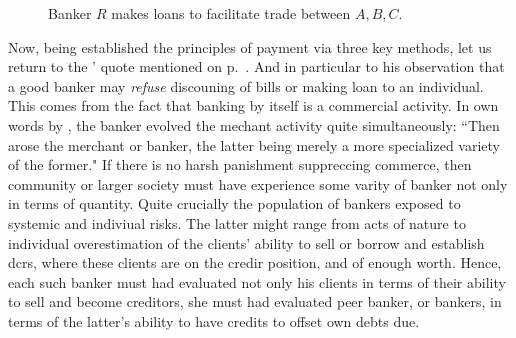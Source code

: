 \begin{figure}[!ht]
\caption[Banker $R$ makes loans to facilitate exchange between $A,B,C$]%
{Banker $R$ makes loans to facilitate trade between $A,B,C$.}
\label{fig:bank_mk_loan2}
\vspace{.0in}
\end{figure}

Now, being established the principles of payment via three key methods, let us return to the \citeauthor{innes1913}' quote mentioned on p.~\pageref{innes_on_good_banker}. And in particular to his observation that a good banker may \textit{refuse} discouning of bills or making loan to an individual. This comes from the fact that banking by itself is a commercial activity. In own words by \citeauthor{innes1913}, the banker evolved the mechant activity quite simultaneously: ``Then arose the merchant or banker, the latter being merely a more specialized variety of the former." \citep[p.~403]{innes1913} If there is no harsh panishment suppreccing commerce, then community or larger society must have experience some varity of banker not only in terms of quantity. Quite crucially the population of bankers exposed to systemic and indiviual risks. The latter might range from acts of nature to individual overestimation of the clients' ability to sell or borrow and establish \acfp{dcr}, where these clients are on the credir position, and of enough worth. Hence, each such banker must had evaluated not only his clients in terms of their ability to sell and become creditors, she must had evaluated peer banker, or bankers, in terms of the latter's ability to have credits to offset own debts due. 

